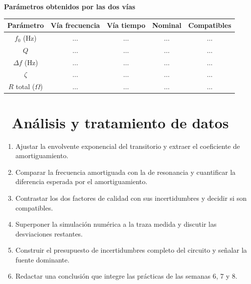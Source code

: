 \documentclass[11pt,a4paper]{article}
\newcommand{\iconotexto}[2]{\textcolor{cyanNeon}{\faIcon{#1}}~#2}
\begin{document}
\begin{center}
\begin{minipage}{\linewidth}
\centering
{\small
\textbf{Parámetros obtenidos por las dos vías}\par\smallskip
\begin{tabular}{@{}ccccc@{}}
\toprule
Parámetro & Vía frecuencia & Vía tiempo & Nominal & Compatibles \\
\midrule
$f_0$ (Hz) & $\ldots$ & $\ldots$ & $\ldots$ & $\ldots$ \\
$Q$ & $\ldots$ & $\ldots$ & $\ldots$ & $\ldots$ \\
$\Delta f$ (Hz) & $\ldots$ & $\ldots$ & $\ldots$ & $\ldots$ \\
$\zeta$ & $\ldots$ & $\ldots$ & $\ldots$ & $\ldots$ \\
$R$ total ($\Omega$) & $\ldots$ & $\ldots$ & $\ldots$ & $\ldots$ \\
\bottomrule
\end{tabular}
}\par{}
\end{minipage}
\end{center}

\section{\iconotexto{calculator}{Análisis y tratamiento de datos}}

\begin{enumerate}[leftmargin=1.4em,itemsep=2pt,topsep=3pt]
  \item Ajustar la envolvente exponencial del transitorio y extraer el coeficiente de amortiguamiento.
  \item Comparar la frecuencia amortiguada con la de resonancia y cuantificar la diferencia esperada por el amortiguamiento.
  \item Contrastar los dos factores de calidad con sus incertidumbres y decidir si son compatibles.
  \item Superponer la simulación numérica a la traza medida y discutir las desviaciones restantes.
  \item Construir el presupuesto de incertidumbres completo del circuito y señalar la fuente dominante.
  \item Redactar una conclusión que integre las prácticas de las semanas 6, 7 y 8.
\end{enumerate}
\end{document}

